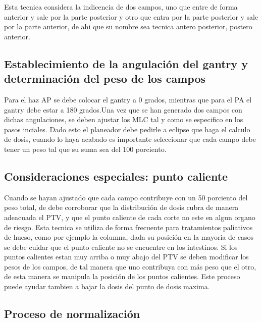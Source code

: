 \documentclass{article}
\begin{document}
Esta tecnica considera la indicencia de dos campos, uno que entre de forma anterior y sale por la parte posterior y otro que entra por la parte posterior y sale por la parte anterior, de ahi que su nombre sea tecnica antero posterior, postero anterior. 

\vspace{10pt}

\subsection{Establecimiento de la angulación del gantry y determinación del peso de los campos}

Para el haz AP se debe colocar el gantry a 0 grados, mientras que para el PA el gantry debe estar a 180 grados.Una vez que se han generado dos campos con dichas angulaciones, se deben ajustar los MLC tal y como se especifico en los pasos inciales. Dado esto el planeador debe pedirle a eclipse que haga el calculo de dosis, cuando lo haya acabado es importante seleccionar que cada campo debe tener un peso tal que su suma sea del 100 porciento. 

\vspace{10pt}

\subsection{Consideraciones especiales: punto caliente}

Cuando se hayan ajustado que cada campo contribuye con un 50 porciento del peso total, de debe corroborar que la distribución de dosis cubra de manera adeacuada el PTV, y que el punto caliente de cada corte no este en algun organo de riesgo. Esta tecnica se utiliza de forma frecuente para tratamientos paliativos de hueso, como por ejemplo la columna, dada su posición en la mayoria de casos se debe cuidar que el punto caliente no se encuentre en los intestinos. Si los puntos calientes estan muy arriba o muy abajo del PTV se deben modificar los pesos de los campos, de tal manera que uno contribuya con más peso que el otro, de esta manera se manipula la posición de los puntos calientes. Este proceso puede ayudar tambien a bajar la dosis del punto de dosis maxima.

\vspace{10pt}

\subsection{Proceso de normalización}
\end{document}
